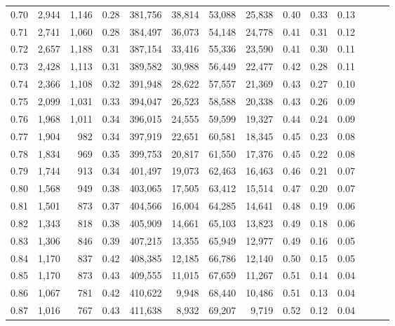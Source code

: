 \begin{tabular}{rrrrrrrrrrrrrr}
0.70 &   2,944 &  1,146 &  0.28 &  381,756 &   38,814 &  53,088 &  25,838 &  0.40 &  0.33 &      0.13 \\
0.71 &   2,741 &  1,060 &  0.28 &  384,497 &   36,073 &  54,148 &  24,778 &  0.41 &  0.31 &      0.12 \\
0.72 &   2,657 &  1,188 &  0.31 &  387,154 &   33,416 &  55,336 &  23,590 &  0.41 &  0.30 &      0.11 \\
0.73 &   2,428 &  1,113 &  0.31 &  389,582 &   30,988 &  56,449 &  22,477 &  0.42 &  0.28 &      0.11 \\
0.74 &   2,366 &  1,108 &  0.32 &  391,948 &   28,622 &  57,557 &  21,369 &  0.43 &  0.27 &      0.10 \\
0.75 &   2,099 &  1,031 &  0.33 &  394,047 &   26,523 &  58,588 &  20,338 &  0.43 &  0.26 &      0.09 \\
0.76 &   1,968 &  1,011 &  0.34 &  396,015 &   24,555 &  59,599 &  19,327 &  0.44 &  0.24 &      0.09 \\
0.77 &   1,904 &    982 &  0.34 &  397,919 &   22,651 &  60,581 &  18,345 &  0.45 &  0.23 &      0.08 \\
0.78 &   1,834 &    969 &  0.35 &  399,753 &   20,817 &  61,550 &  17,376 &  0.45 &  0.22 &      0.08 \\
0.79 &   1,744 &    913 &  0.34 &  401,497 &   19,073 &  62,463 &  16,463 &  0.46 &  0.21 &      0.07 \\
0.80 &   1,568 &    949 &  0.38 &  403,065 &   17,505 &  63,412 &  15,514 &  0.47 &  0.20 &      0.07 \\
0.81 &   1,501 &    873 &  0.37 &  404,566 &   16,004 &  64,285 &  14,641 &  0.48 &  0.19 &      0.06 \\
0.82 &   1,343 &    818 &  0.38 &  405,909 &   14,661 &  65,103 &  13,823 &  0.49 &  0.18 &      0.06 \\
0.83 &   1,306 &    846 &  0.39 &  407,215 &   13,355 &  65,949 &  12,977 &  0.49 &  0.16 &      0.05 \\
0.84 &   1,170 &    837 &  0.42 &  408,385 &   12,185 &  66,786 &  12,140 &  0.50 &  0.15 &      0.05 \\
0.85 &   1,170 &    873 &  0.43 &  409,555 &   11,015 &  67,659 &  11,267 &  0.51 &  0.14 &      0.04 \\
0.86 &   1,067 &    781 &  0.42 &  410,622 &    9,948 &  68,440 &  10,486 &  0.51 &  0.13 &      0.04 \\
0.87 &   1,016 &    767 &  0.43 &  411,638 &    8,932 &  69,207 &   9,719 &  0.52 &  0.12 &      0.04 \\

\end{tabular}
